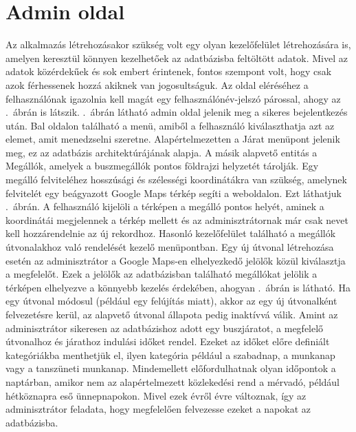 \section{Admin oldal}
\label{admin}
Az alkalmazás létrehozásakor szükség volt egy olyan kezelőfelület létrehozására is, amelyen keresztül könnyen kezelhetőek az adatbázisba feltöltött adatok.
Mivel az adatok közérdekűek és sok embert érintenek, fontos szempont volt, hogy csak azok férhessenek hozzá akiknek van jogosultságuk.
Az oldal eléréséhez a felhasználónak igazolnia kell magát egy felhasználónév-jelszó párossal, ahogy az .\ ábrán is látszik.
.\ ábrán látható admin oldal jelenik meg a sikeres bejelentkezés után.
Bal oldalon található a menü, amiből a felhasználó kiválaszthatja azt az elemet, amit menedzselni szeretne.
Alapértelmezetten a Járat menüpont jelenik meg, ez az adatbázis architektúrájának alapja.
A másik alapvető entitás a Megállók, amelyek a buszmegállók pontos földrajzi helyzetét tárolják.
Egy megálló felviteléhez hosszúsági és szélességi koordinátákra van szükség, amelynek felvitelét egy beágyazott Google Maps térkép segíti a weboldalon.
Ezt láthatjuk .\ ábrán.
A felhasználó kijelöli a térképen a megálló pontos helyét, aminek a koordinátái megjelennek a térkép mellett és az adminisztrátornak már csak nevet kell hozzárendelnie az új rekordhoz.
Hasonló kezelőfelület található a megállók útvonalakhoz való rendelését kezelő menüpontban.
Egy új útvonal létrehozása esetén az adminisztrátor a Google Maps-en elhelyezkedő jelölők közül kiválasztja a megfelelőt.
Ezek a jelölők az adatbázisban található megállókat jelölik a térképen elhelyezve a könnyebb kezelés érdekében, ahogyan .\ ábrán is látható.
Ha egy útvonal módosul (például egy felújítás miatt), akkor az egy új útvonalként felvezetésre kerül, az alapvető útvonal állapota pedig inaktívvá válik.
Amint az adminisztrátor sikeresen az adatbázishoz adott egy buszjáratot, a megfelelő útvonalhoz és járathoz indulási időket rendel.
Ezeket az időket előre definiált kategóriákba menthetjük el, ilyen kategória például a szabadnap, a munkanap vagy a tanszüneti munkanap.
Mindemellett előfordulhatnak olyan időpontok a naptárban, amikor nem az alapértelmezett közlekedési rend a mérvadó, például hétköznapra eső ünnepnapokon.
Mivel ezek évről évre változnak, így az adminisztrátor feladata, hogy megfelelően felvezesse ezeket a napokat az adatbázisba.

